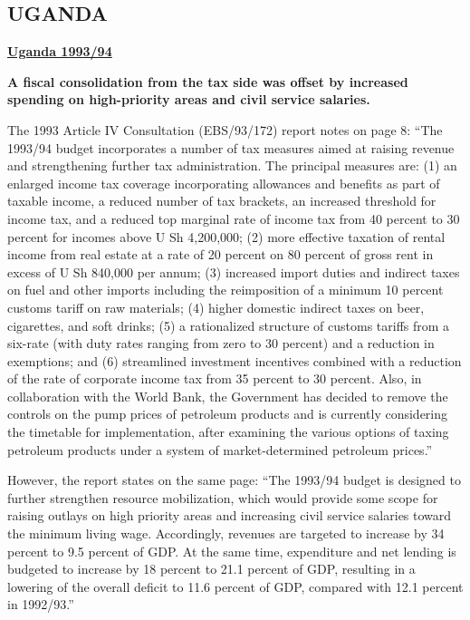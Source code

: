 \subsection[UGANDA]{UGANDA\protect\footnotemark}

\textbf{\underline{Uganda 1993/94}} 

\textbf{A fiscal consolidation from the tax side was offset by increased spending on high-priority areas and civil service salaries.}

The 1993 Article IV Consultation (EBS/93/172) report notes on page 8: “The 1993/94 budget incorporates a number of tax measures aimed at raising revenue and strengthening further tax administration. The principal measures are: (1) an enlarged income tax coverage incorporating allowances and benefits as part of taxable income, a reduced number of tax brackets, an increased threshold for income tax, and a reduced top marginal rate of income tax from 40 percent to 30 percent for incomes above U Sh 4,200,000; (2) more effective taxation of rental income from real estate at a rate of 20 percent on 80 percent of gross rent in excess of U Sh 840,000 per annum; (3) increased import duties and indirect taxes on fuel and other imports including the reimposition of a minimum 10 percent customs tariff on raw materials; (4) higher domestic indirect taxes on beer, cigarettes, and soft drinks; (5) a rationalized structure of customs tariffs from a six-rate (with duty rates ranging from zero to 30 percent) and a reduction in exemptions; and (6) streamlined investment incentives combined with a reduction of the rate of corporate income tax from 35 percent to 30 percent. Also, in collaboration with the World Bank, the Government has decided to remove the controls on the pump prices of petroleum products and is currently considering the timetable for implementation, after examining the various options of taxing petroleum products under a system of market-determined petroleum prices.”

However, the report states on the same page: “The 1993/94 budget is designed to further strengthen resource mobilization, which would provide some scope for raising outlays on high priority areas and increasing civil service salaries toward the minimum living wage. Accordingly, revenues are targeted to increase by 34 percent to 9.5 percent of GDP. At the same time, expenditure and net lending is budgeted to increase by 18 percent to 21.1 percent of GDP, resulting in a lowering of the overall deficit to 11.6 percent of GDP, compared with 12.1 percent in 1992/93.”

